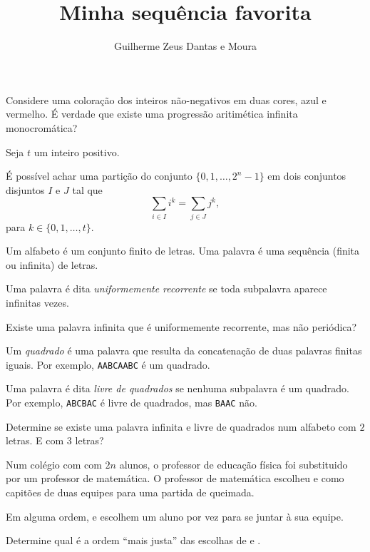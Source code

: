 \documentclass[10pt,a4paper]{article}
\title{Minha sequência favorita}
\author{Guilherme Zeus Dantas e Moura}
\begin{document}
	
	\zeustitle

	\begin{prob}
		Considere uma coloração dos inteiros não-negativos em duas cores, azul e vermelho. É verdade que existe uma progressão aritimética infinita monocromática?
	\end{prob}

	\begin{prob}
		Seja $t$ um inteiro positivo.

		É possível achar uma partição do conjunto $\{0, 1, \dots, 2^n - 1 \}$ em dois conjuntos disjuntos $I$ e $J$ tal que \[
			\sum_{i\in I} i^k = \sum_{j \in J} j^k,
		\]
		para $k \in \{0, 1, \dots, t\}$.
	\end{prob}

	\begin{prob}
		Um alfabeto é um conjunto finito de letras. Uma palavra é uma sequência (finita ou infinita) de letras.

		Uma palavra é dita \emph{uniformemente recorrente} se toda subpalavra aparece infinitas vezes.

		Existe uma palavra infinita que é uniformemente recorrente, mas não periódica?
	\end{prob}

	\begin{prob}
		Um \emph{quadrado} é uma palavra que resulta da concatenação de duas palavras finitas iguais. Por exemplo, \texttt{AABCAABC} é um quadrado.

		Uma palavra é dita \emph{livre de quadrados} se nenhuma subpalavra é um quadrado. Por exemplo, \texttt{ABCBAC} é livre de quadrados, mas \texttt{BAAC} não.

		Determine se existe uma palavra infinita e livre de quadrados num alfabeto com $2$ letras. E com $3$ letras?
	\end{prob}

	\begin{ques}
		Num colégio com com $2n$ alunos, o professor de educação física foi substituido por um professor de matemática. O professor de matemática escolheu  e  como capitões de duas equipes para uma partida de queimada. 

		Em alguma ordem,  e  escolhem um aluno por vez para se juntar à sua equipe.

		Determine qual é a ordem ``mais justa'' das escolhas de  e .
	\end{ques}
\end{document}
